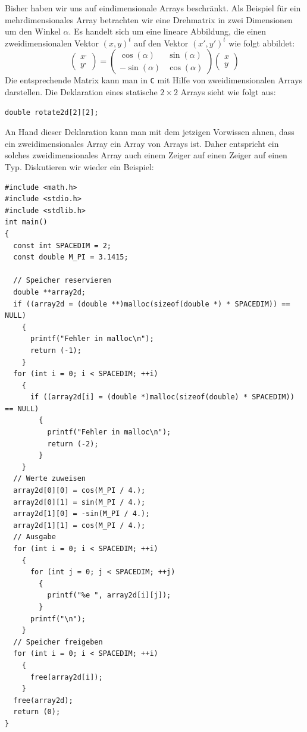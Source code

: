 Bisher haben wir uns auf eindimensionale Arrays beschränkt.
Als Beispiel für ein mehrdimensionales Array betrachten wir eine Drehmatrix in zwei Dimensionen um den Winkel $\alpha$. 
Es handelt sich um eine lineare Abbildung, die einen zweidimensionalen Vektor $(x,y)^t$ auf den Vektor $(x',y')^t$ wie folgt abbildet:
\begin{equation}
  \left(\begin{array}{c}x^{,}\\y^{,}\end{array}\right)=
  \left(\begin{array}{cc} \cos\left(\alpha\right) & \sin\left(\alpha\right) \\
    -\sin\left(\alpha\right) & \cos\left(\alpha\right) 
  \end{array}\right)
  \left(\begin{array}{c}x\\y\end{array}\right)
\end{equation}
Die entsprechende Matrix kann man in \texttt{C} mit Hilfe von zweidimensionalen Arrays darstellen.
Die Deklaration eines statische $2\times2$ Arrays sieht wie folgt aus:
\begin{lstlisting}
double rotate2d[2][2];
\end{lstlisting}
An Hand dieser Deklaration kann man mit dem jetzigen Vorwissen ahnen, dass ein zweidimensionales Array ein Array von Arrays ist.
Daher entspricht ein solches zweidimensionales Array auch einem Zeiger auf einen Zeiger auf einen Typ.
Diskutieren wir wieder ein Beispiel:
\begin{lstlisting}
#include <math.h>
#include <stdio.h>
#include <stdlib.h>
int main()
{
  const int SPACEDIM = 2;
  const double M_PI = 3.1415;

  // Speicher reservieren
  double **array2d;
  if ((array2d = (double **)malloc(sizeof(double *) * SPACEDIM)) == NULL)
    {
      printf("Fehler in malloc\n");
      return (-1);
    }
  for (int i = 0; i < SPACEDIM; ++i)
    {
      if ((array2d[i] = (double *)malloc(sizeof(double) * SPACEDIM)) == NULL)
        {
          printf("Fehler in malloc\n");
          return (-2);
        }
    }
  // Werte zuweisen
  array2d[0][0] = cos(M_PI / 4.);
  array2d[0][1] = sin(M_PI / 4.);
  array2d[1][0] = -sin(M_PI / 4.);
  array2d[1][1] = cos(M_PI / 4.);
  // Ausgabe
  for (int i = 0; i < SPACEDIM; ++i)
    {
      for (int j = 0; j < SPACEDIM; ++j)
        {
          printf("%e ", array2d[i][j]);
        }
      printf("\n");
    }
  // Speicher freigeben
  for (int i = 0; i < SPACEDIM; ++i)
    {
      free(array2d[i]);
    }
  free(array2d);
  return (0);
}
\end{lstlisting}
